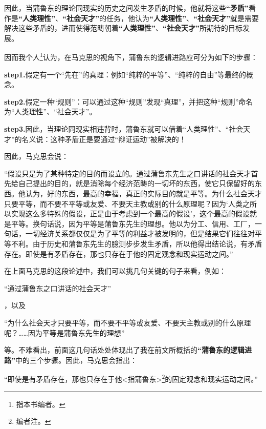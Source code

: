 \documentclass[a4paper,twoside,12pt,AutoFakeBold]{ctexart}
\begin{document}
因此，当蒲鲁东的理论同现实的历史之间发生矛盾的时候，他就将这些\textbf{“矛盾”}看作是\textbf{“人类理性”}、\textbf{“社会天才”}的任务，他认为\textbf{“人类理性”}、\textbf{“社会天才”}就是需要解决这些矛盾的，进而使得范畴朝着\textbf{“人类理性”}、\textbf{“社会天才”}所期待的目标发展。

因而我个人\footnote{指本书编者。}认为，在马克思的视角下，蒲鲁东的逻辑进路应可分为如下的步骤：


\begin{tcolorbox}[colback=gray!20, colframe=gray!100, sharp corners, leftrule={3pt}, rightrule={0pt}, toprule={0pt}, bottomrule={0pt}, left={2pt}, right={2pt}, top={3pt}, bottom={3pt}] 
\textbf{step1.}假定有一个“先在”的真理：例如“纯粹的平等”、“纯粹的自由”等最终的概念。

\textbf{step2.}假定一种“规则”：可以通过这种“规则”发现“真理”，并把这种“规则”命名为“人类理性”、“社会天才”。

\textbf{step3.}因此，当理论同现实相违背时，蒲鲁东就可以借着“人类理性”、“社会天才”的名义说：这种矛盾正是要通过“辩证运动”被解决的！


\end{tcolorbox}

因此，马克思会说：
\begin{adjustwidth}{2em}{2em}
    \qquad\fangsong
    “假设只是为了某种特定的目的而设立的。通过蒲鲁东先生之口讲话的社会天才首先给自己提出的目的，就是消除每个经济范畴的一切坏的东西，使它只保留好的东西。他认为，好的东西，最高的幸福，真正的实际目的就是平等。为什么社会天才只要平等，而不要不平等或友爱、不要天主教或别的什么原理呢？因为‘人类之所以实现这么多特殊的假设，正是由于考虑到一个最高的假设’，这个最高的假设就是平等。换句话说，因为平等是蒲鲁东先生的理想。他以为分工、信用、工厂，一句话，一切经济关系都仅仅是为了平等的利益才被发明的，但是结果它们往往对平等不利。由于历史和蒲鲁东先生的臆测步步发生矛盾，所以他得出结论说，有矛盾存在。即使是有矛盾存在，那也只存在于他的固定观念和现实运动之间。”
\end{adjustwidth}

在上面马克思的这段论述中，我们可以挑几句关键的句子来看，例如：\begin{fangsong}
    “通过蒲鲁东之口讲话的社会天才”
\end{fangsong}，以及\begin{fangsong}
    “为什么社会天才只要平等，而不要不平等或友爱、不要天主教或别的什么原理呢？……因为平等是蒲鲁东先生的理想”
\end{fangsong}
等。不难看出，前面这几句话处处体现出了我在前文所概括的\textbf{“蒲鲁东的逻辑进路”}中的三个步骤。因此，马克思会指出：\begin{fangsong}
    “即使是有矛盾存在，那也只存在于他<指蒲鲁东>\footnote{编者注。}的固定观念和现实运动之间。”
\end{fangsong}
\end{document}
